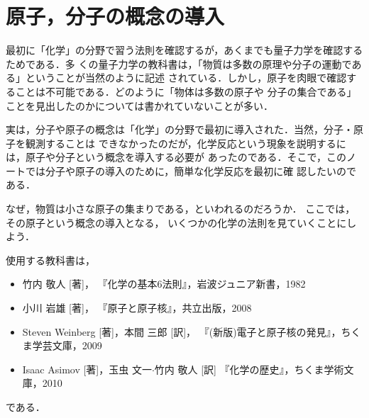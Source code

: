 ﻿%
    \section{原子，分子の概念の導入}
        \begin{mycomment}
            最初に「化学」の分野で習う法則を確認するが，あくまでも量子力学を確認するためである．多
            くの量子力学の教科書は，「物質は多数の原理や分子の運動である」ということが当然のように記述
            されている．しかし，原子を肉眼で確認することは不可能である．どのように「物体は多数の原子や
            分子の集合である」ことを見出したのかについては書かれていないことが多い．

            実は，分子や原子の概念は「化学」の分野で最初に導入された．当然，分子・原子を観測することは
            できなかったのだが，化学反応という現象を説明するには，原子や分子という概念を導入する必要が
            あったのである．そこで，このノートでは分子や原子の導入のために，簡単な化学反応を最初に確
            認したいのである．

            なぜ，物質は小さな原子の集まりである，といわれるのだろうか．
            ここでは，その原子という概念の導入となる，
            いくつかの化学の法則を見ていくことにしよう．

            使用する教科書は，
                \begin{itemize}
                    \item 竹内 敬人 [著]，
                            『化学の基本6法則』，岩波ジュニア新書，1982
                    \item 小川 岩雄 [著]，
                            『原子と原子核』，共立出版，2008
                    \item Steven Weinberg [著]，本間 三郎 [訳]，
                            『(新版)電子と原子核の発見』，ちくま学芸文庫，2009
                    \item Isaac Asimov [著]，玉虫 文一$\cdot$竹内 敬人 [訳]
                            『化学の歴史』，ちくま学術文庫，2010
                \end{itemize}
            である．
        \end{mycomment}

